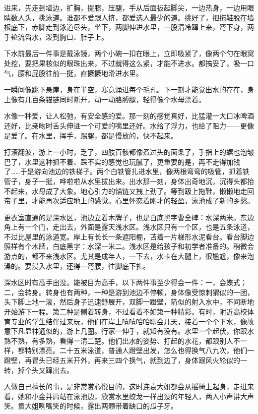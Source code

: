 \documentclass[lang=cn,newtx,12pt,scheme=chinese]{elegantbook}
\begin{document}
进来，先走到墙边，扩胸，提膝，压腿，手从后面扳起脚尖，一边热身，一边用眼睛数人头，挑泳道。谁都不爱跟人挤，都爱选人最少的道。挑好了，把拖鞋脱在墙根底下，赤脚走到泳道尽头，坐下，两脚伸进水里，一股清冷蹿上来，弯下身，两手轮流舀水，泼到胸口、肚子上。

下水前最后一件事是戴泳镜，两个小碗一扣在眼上，立即吸紧了，像两个勺在眼窝处挖，要把果核似的眼珠出来，不过就得这么紧，才能不进水。都搞妥了，吸一口气，腰和屁股往前一挺，直撅撅地滑进水里。

一瞬间像跳下悬崖，身在半空，寒意涌进每个毛孔。下一刻才能觉出水的存在，身上像有几百条锚链同时断开，动一动胳膊腿，轻得像个水母漂着。

水像一种爱，让人松弛，有安全感的爱。那一刻的感觉真好，比猛灌一大口冰啤酒还好，比亲吻时舌头伸进一个可爱的嘴里还好。水给了浮力，也给了阻力——更像是爱了。在水里，挥手，踢腿，都是慢放的，快不起来。

打滚翻波，游上一小时，乏了，四肢百骸都像煮过头的面条了，手指上的螺也泡皱巴了，水里这种抓不着、踩不实的感觉也玩腻了，更重要的是，再不走得加钱了……于是游向池边的铁梯子。两个白铁管扎进水里，像两根弯弯的吸管，抓着铁管子，身子一挺，哗啦啦从水里拔出来。出水那一刻，身体出奇地沉，沉得头都抬不起来，水母成了大象。地心引力的锚链又拽上劲了。等到趿上拖鞋，懒懒地走回帘子里，才能再次适应地上的感觉。心里怀恋着刚才的轻盈，泳池成了新的乡愁。

更衣室直通的是深水区，池边立着木牌子，也是白底黑字曹全碑：水深两米。东边角上有一个门，走出去，外面是露天浅水区。浅水区只有一个区，也是五条泳道，不过比屋里的泳道宽。岸上有长长一条遮阳棚，苫着一片梯形水泥看台。看台脚边照样有个木牌，白底黑字：水深一米二。浅水区是给孩子和初学者准备的。稍微会游点的，都不来浅水区。尤其是成年人，一下去，水卡在大腿上，很尴尬，像来泡澡的。要浸入水里，还得一弯腰，往脚底下扎。

深水区时有高手出没。能被目为高手，以下两件事至少得会一件：一，会蝶式；二，会转身。转身也有两种，一种是游到池边不停顿，身体像受惊刺猬似的一团，头下脚上地一滚，然后身子迅速舒展开，双脚一蹬壁，箭似的射入水中，不间断地开始游下一程。第二种是侧着转身，不过看着不如第一种精彩。有时，附近高校体育专业的学生结伴过来玩，他们在岸上嘻嘻哈哈聊会儿天，接着一个个下水，像故意下凡显神通似的，游上几圈。行家一伸手，就知有没有。水里一个起伏，你跟水熟不熟，有多熟，看得一清二楚。他们出水的姿势、打起的水花，都跟别人不一样，都特别漂亮。二十五米泳道，普通人蹬壁出发，怎么也得换气八九次，他们一蹬壁，再冒头已经五米开外，再来三四个换气，就到边了，身体跟风火轮似的一转，掉个头又蹿出去。

人做自己擅长的事，是非常赏心悦目的，这时连袁大姐都会从摇椅上起身，走进来看，她和小金并肩站在泳池边，欣赏水里蛟龙一样出没的年轻人，两人小声讲大声笑。袁大姐咧嘴笑的时候，露出两颗带着缺口的瓜子牙。
\end{document}
